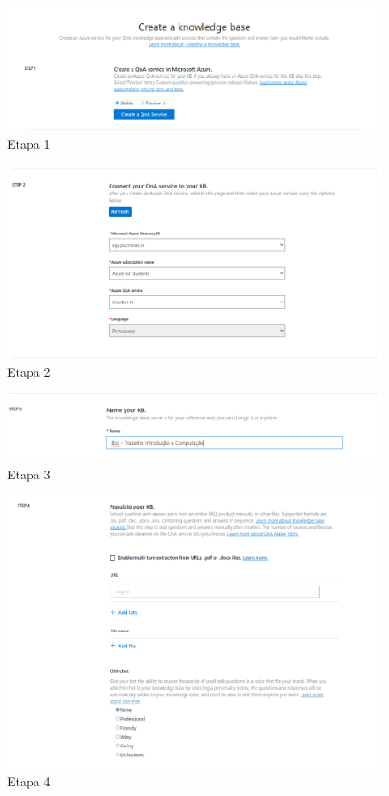 \documentclass[12pt]{article}
\begin{document}
\begin{figure}[ht]
\centering
\includegraphics[width=1\textwidth]{images/KnowledgeBase_1.png}
\caption{Etapa 1}
\label{fig:exampleFig1}
\end{figure}

\begin{figure}[ht]
\centering
\includegraphics[width=1\textwidth]{images/KnowledgeBase_2.png}
\caption{Etapa 2}
\label{fig:exampleFig1}
\end{figure}

\begin{figure}[ht]
\centering
\includegraphics[width=1\textwidth]{images/KnowledgeBase_3.png}
\caption{Etapa 3}
\label{fig:exampleFig1}
\end{figure}

\begin{figure}[ht]
\centering
\includegraphics[width=1\textwidth]{images/KnowledgeBase_4.png}
\caption{Etapa 4}
\label{fig:exampleFig1}
\end{figure}
\end{document}
